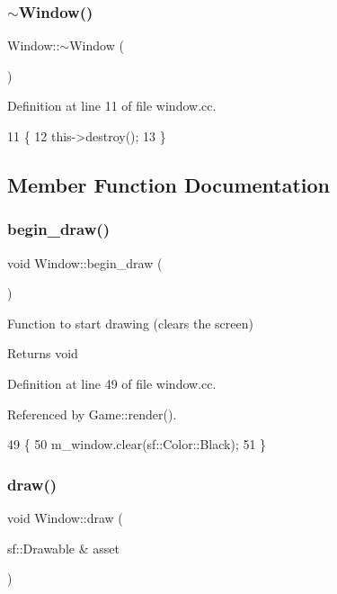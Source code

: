 \subsubsection{\texorpdfstring{$\sim$\+Window()}{~Window()}}
{\footnotesize\ttfamily Window\+::$\sim$\+Window (\begin{DoxyParamCaption}{ }\end{DoxyParamCaption})}



Definition at line 11 of file window.\+cc.


\begin{DoxyCode}
11                 \{
12     this->destroy();
13 \}
\end{DoxyCode}


\subsection{Member Function Documentation}
\mbox{\label{class_window_a9a01adf499565557def564579805c413}} 
\subsubsection{\texorpdfstring{begin\+\_\+draw()}{begin\_draw()}}
{\footnotesize\ttfamily void Window\+::begin\+\_\+draw (\begin{DoxyParamCaption}{ }\end{DoxyParamCaption})}



Function to start drawing (clears the screen) 

\begin{DoxyReturn}{Returns}
void 
\end{DoxyReturn}


Definition at line 49 of file window.\+cc.



Referenced by Game\+::render().


\begin{DoxyCode}
49                         \{
50     m\_window.clear(sf::Color::Black);
51 \}
\end{DoxyCode}
\mbox{\label{class_window_ab9e37002f72c90f1a6075459729f6c0f}} 
\subsubsection{\texorpdfstring{draw()}{draw()}}
{\footnotesize\ttfamily void Window\+::draw (\begin{DoxyParamCaption}\item[{sf\+::\+Drawable \&}]{asset }\end{DoxyParamCaption})}



